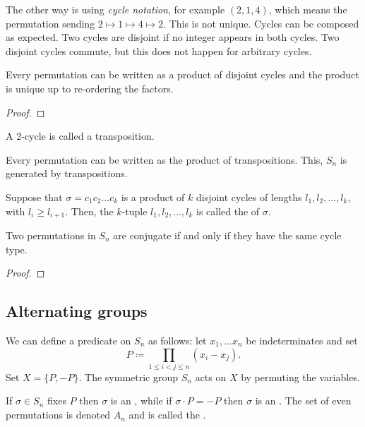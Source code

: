 The other way is using \emph{cycle notation}, for example \((2,1,4)\), which means the permutation sending \(2 \mapsto 1 \mapsto 4 \mapsto 2\). This is not unique. Cycles can be composed as expected. Two cycles are disjoint if no integer appears in both cycles. Two disjoint cycles commute, but this does not happen for arbitrary cycles.

\begin{lemma}
  Every permutation can be written as a product of disjoint cycles and the product is unique up to re-ordering the factors.
\end{lemma}
\begin{proof}
\end{proof}

A 2-cycle is called a transposition.

\begin{lemma}
  Every permutation can be written as the product of transpositions. This, \(S_{n}\) is generated by transpositions.
\end{lemma}


\begin{definition}
  Suppose that \(\sigma = c_{1}c_{2} \ldots c_{k}\) is a product of \(k\) disjoint cycles of lengths \(l_{1}, l_{2}, \ldots, l_{k}\), with \(l_{i} \geq l_{i+1}\). Then, the \(k\)-tuple \(l_{1}, l_{2}, \ldots, l_{k}\) is called the  of \(\sigma\).
\end{definition}

\begin{theorem}
  Two permutations in \(S_{n}\) are conjugate if and only if they have the same cycle type.
\end{theorem}
\begin{proof}
\end{proof}

\subsection{Alternating groups}
We can define a predicate on \(S_{n}\) as follows: let \(x_{1}, \ldots x_{n}\) be indeterminates and set
\[P \coloneqq \prod_{1 \leq i < j \leq n} (x_{i} - x_{j}).\]
Set \(X = \{P, -P\}\). The symmetric group \(S_{n}\) acts on \(X\) by permuting the variables.

\begin{definition}
  If \(\sigma \in S_{n}\) fixes \(P\) then \(\sigma\) is an , while if \(\sigma \cdot P = -P\) then \(\sigma\) is an . The set of even permutations is denoted \(A_{n}\) and is called the .
\end{definition}



